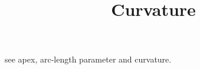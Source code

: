 \documentclass{ximera}
\title[Dig-In:]{Curvature}
\begin{document}
\begin{abstract}
\end{abstract}
\maketitle


see apex, arc-length parameter and curvature.
\end{document}
